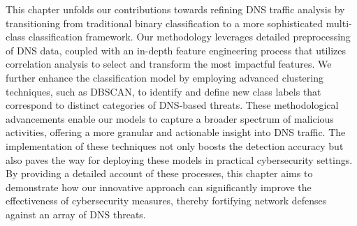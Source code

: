 \label{chapFusionConsens}


This chapter unfolds our contributions towards refining DNS traffic analysis by transitioning from traditional binary classification to a more sophisticated multi-class classification framework. Our methodology leverages detailed preprocessing of DNS data, coupled with an in-depth feature engineering process that utilizes correlation analysis to select and transform the most impactful features. We further enhance the classification model by employing advanced clustering techniques, such as DBSCAN, to identify and define new class labels that correspond to distinct categories of DNS-based threats. These methodological advancements enable our models to capture a broader spectrum of malicious activities, offering a more granular and actionable insight into DNS traffic. The implementation of these techniques not only boosts the detection accuracy but also paves the way for deploying these models in practical cybersecurity settings. By providing a detailed account of these processes, this chapter aims to demonstrate how our innovative approach can significantly improve the effectiveness of cybersecurity measures, thereby fortifying network defenses against an array of DNS threats.




